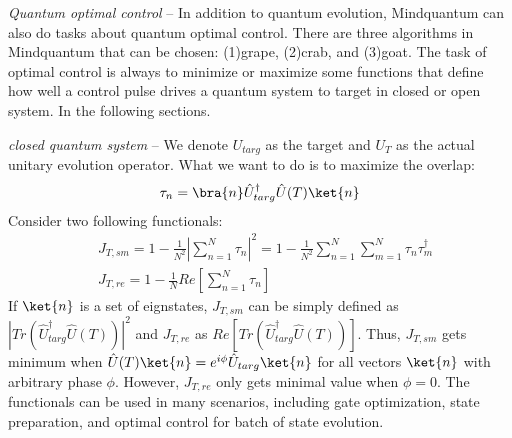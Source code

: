 \textit{Quantum optimal control} -- In addition to quantum evolution, Mindquantum can also do tasks about quantum optimal control. There are three algorithms in Mindquantum that can be chosen: (1)grape, (2)crab, and (3)goat. The task of optimal control is always to minimize or maximize some functions that define how well a control pulse drives a quantum system to target in closed or open system. In the following sections.

\textit{closed quantum system} -- We denote $U_{targ}$ as the target and $U_{T}$ as the actual unitary evolution operator. What we want to do is to maximize the overlap:
\begin{equation}
    \tau_{n}=\bra{n}\hat{U}_{targ}^{\dagger}\hat{U}(T)\ket{n}
\end{equation}
Consider two following functionals:
\begin{equation}
    \begin{split}
        &J_{T,sm}=1-\frac{1}{N^{2}}\left|\sum_{n=1}^{N}\tau_{n}\right|^{2}=1-\frac{1}{N^{2}}\sum_{n=1}^{N}\sum_{m=1}^{N}\tau_{n}\tau_{m}^{\dagger}\\
        &J_{T,re}=1-\frac{1}{N}Re\left[\sum_{n=1}^{N}\tau_{n}\right]
    \end{split}
    \label{close}
\end{equation}
If ${\ket{n}}$ is a  set of eignstates, $J_{T,sm}$ can be simply defined as $\left|Tr(\hat{U}_{targ}^{\dagger}\hat{U}(T))\right|^{2}$ and $J_{T,re}$ as $Re[Tr(\hat{U}^{\dagger}_{targ}\hat{U}(T))]$. Thus, $J_{T,sm}$ gets minimum when $\hat{U}(T)\ket{n}=e^{i\phi}\hat{U}_{targ}\ket{n}$ for all vectors $\ket{n}$ with arbitrary phase $\phi$. However, $J_{T,re}$ only gets minimal value when $\phi=0$. The functionals can be used in many scenarios, including gate optimization, state preparation, and optimal control for batch of state evolution.

